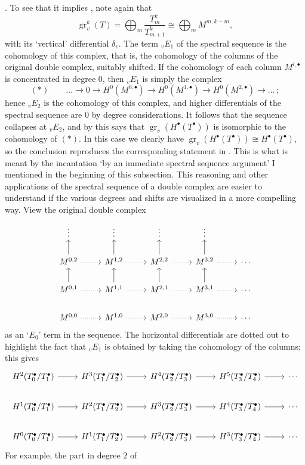 . To see that it implies ,
note again that
\[
  \operatorname{gr}_v^k(T) = \bigoplus_m \frac{T_m^k}{T_{m+1}^k} \cong
  \bigoplus_m M^{m,k-m},
\]
with its `vertical' differential $\delta_v$. The term ${}_vE_1$ of the
spectral sequence is the cohomology of this complex, that is, the
cohomology of the columns of the original double complex, suitably
shifted. If the cohomology of each column $M^{i,\bullet}$ is
concentrated in degree $0$, then ${}_vE_1$ is simply the complex
\[
  (*) \qquad \dots \longrightarrow 0 \longrightarrow
  H^0(M^{0,\bullet}) \longrightarrow H^0(M^{1,\bullet})
  \longrightarrow H^0(M^{2,\bullet}) \longrightarrow \dots \, ;
\]
hence ${}_vE_2$ is the cohomology of this complex, and higher
differentials of the spectral sequence are $0$ by degree
considerations. It follows that the sequence collapses at ${}_vE_2$,
and by  this says that
$\operatorname{gr}_v(H^\bullet(T^\bullet))$ is isomorphic to the
cohomology of $(*)$. In this case we clearly have
$\operatorname{gr}_v(H^\bullet(T^\bullet)) \cong
H^\bullet(T^\bullet)$, so the conclusion reproduces the corresponding
statement in . This is what is meant by the
incantation `by an immediate spectral sequence argument' I mentioned
in the beginning of this subsection.  This reasoning and other
applications of the spectral sequence of a double complex are easier
to understand if the various degrees and shifts are visualized in a
more compelling way. View the original double complex
\[\begin{tikzcd}
    \vdots & \vdots & \vdots & \vdots & \\
    M^{0,2} \arrow[u] \arrow[r,dotted] & M^{1,2} \arrow[u] \arrow[r,dotted] & M^{2,2} \arrow[u] \arrow[r,dotted] & M^{3,2} \arrow[u] \arrow[r,dotted] & \cdots \\
    M^{0,1} \arrow[u] \arrow[r,dotted] & M^{1,1} \arrow[u] \arrow[r,dotted] & M^{2,1} \arrow[u] \arrow[r,dotted] & M^{3,1} \arrow[u] \arrow[r,dotted] & \cdots \\
    M^{0,0} \arrow[r,dotted] & M^{1,0} \arrow[r,dotted] & M^{2,0}
    \arrow[r,dotted] & M^{3,0} \arrow[r,dotted] & \cdots
  \end{tikzcd}\] as an `$E_0$' term in the sequence. The horizontal
differentials are dotted out to highlight the fact that ${}_vE_1$ is
obtained by taking the cohomology of the columns; this gives
\[\begin{tikzcd}
    H^2(T_0^\bullet/T_1^\bullet) \arrow[r] & H^3(T_1^\bullet/T_2^\bullet) \arrow[r] & H^4(T_2^\bullet/T_3^\bullet) \arrow[r] & H^5(T_3^\bullet/T_4^\bullet) \arrow[r] & \cdots \\
    H^1(T_0^\bullet/T_1^\bullet) \arrow[r] & H^2(T_1^\bullet/T_2^\bullet) \arrow[r] & H^3(T_2^\bullet/T_3^\bullet) \arrow[r] & H^4(T_3^\bullet/T_4^\bullet) \arrow[r] & \cdots \\
    H^0(T_0^\bullet/T_1^\bullet) \arrow[r] &
    H^1(T_1^\bullet/T_2^\bullet) \arrow[r] &
    H^2(T_2^\bullet/T_3^\bullet) \arrow[r] &
    H^3(T_3^\bullet/T_4^\bullet) \arrow[r] & \cdots
  \end{tikzcd}\] For example, the part in degree $2$ of
